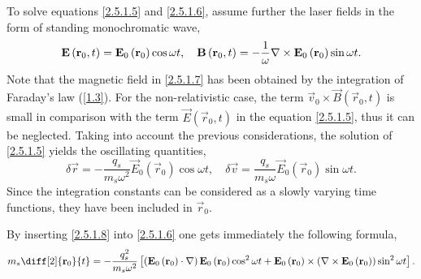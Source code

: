 To solve equations \ref{2.5.1.5} and \ref{2.5.1.6}, assume further the laser fields in the form of standing monochromatic wave, 
\begin{equation}
\label{2.5.1.7}
\mathbf{E}\left(\mathbf{r}_0, t\right) = \mathbf{E}_0 \left(\mathbf{r}_0 \right) \cos \omega t, \quad  \mathbf{B}\left(\mathbf{r}_0, t\right) = - \frac{1}{\omega} \nabla \times \mathbf{E}_0 \left(\mathbf{r}_0 \right) \sin \omega t.
\end{equation}
Note that the magnetic field in \ref{2.5.1.7} has been obtained by the integration of Faraday's law (\ref{1.3}). For the non-relativistic case, the term $ \vec{v}_0 \times \vec{B}\left(\vec{r}_0, t\right) $ is small in comparison with the term $ \vec{E}\left(\vec{r}_0, t\right) $ in the equation \ref{2.5.1.5}, thus it can be neglected. Taking into account the previous considerations, the solution of \ref{2.5.1.5} yields the oscillating quantities,
\begin{equation}
\label{2.5.1.8}
\delta \vec{r} = -\frac{q_s}{m_s \omega^2} \vec{E}_0 \left(\vec{r}_0 \right) \cos \omega t, \quad \delta \vec{v} = \frac{q_s}{m_s \omega} \vec{E}_0 \left(\vec{r}_0 \right) \sin \omega t.
\end{equation}
Since the integration constants can be considered as a slowly varying time functions, they have been included in $ \vec{r}_0 $.

By inserting \ref{2.5.1.8} into \ref{2.5.1.6} one gets immediately the following formula,
\begin{equation}
\label{2.5.1.9}
m_s \diff[2]{\vec{r}_0}{t} = - \frac{q_s^{2}}{m_s \omega^2} \left[\left(\vec{E}_0 \left(\vec{r}_0 \right) \cdot \nabla \right) \vec{E}_0 \left(\vec{r}_0 \right) \cos^2 \omega t + \vec{E}_0 \left(\vec{r}_0 \right) \times \left( \nabla \times \vec{E}_0 \left(\vec{r}_0 \right) \right) \sin^2 \omega t \right].
\end{equation}

